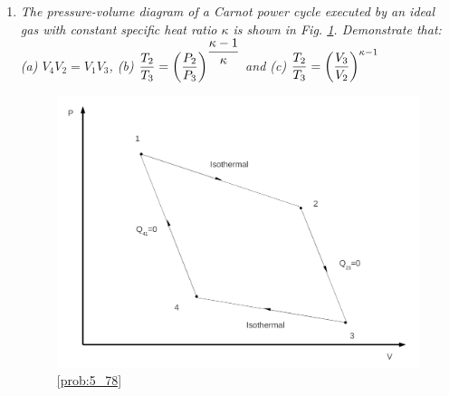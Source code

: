 \begin{enumerate}
\item \label{prob:5_78}{\it The pressure-volume diagram of a Carnot power cycle executed by an ideal gas with constant specific heat ratio $\kappa$ is shown in Fig. \ref{Prob_Saphiro_5.78}. Demonstrate that: (a) $V_{4}V_{2}=V_{1}V_{3}$, (b) $\displaystyle\frac{T_{2}}{T_{3}} = \left(\displaystyle\frac{P_{2}}{P_{3}}\right)^{\displaystyle\frac{\kappa - 1}{\kappa}}$ and (c) $\displaystyle\frac{T_{2}}{T_{3}}=\left(\displaystyle\frac{V_{3}}{V_{2}}\right)^{\kappa - 1}$}
\begin{figure}[h]
\begin{center}
\includegraphics[width=15.cm,clip]{./Pics/Problem_5_78}
\caption{ \ref{prob:5_78}}
\label{Prob_Saphiro_5.78}
\end{center}
\end{figure}


\end{enumerate}
